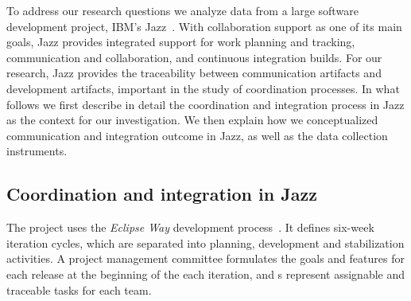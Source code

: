To address our research questions we analyze data from a large software
development project, IBM's Jazz~\cite{frost:ieeesoftware:2007}. With collaboration support
as one of its main goals, Jazz provides integrated support for work planning and
tracking, communication and collaboration, and continuous integration builds. For
our research, Jazz provides the traceability between communication artifacts and
development artifacts, important in the study of coordination processes. In what
follows we first describe in detail the coordination and integration process in
Jazz as the context for our investigation. We then explain how we conceptualized
communication and integration outcome in Jazz, as well as the data collection
instruments.


\subsection{Coordination and integration in Jazz}

The project uses the \emph{Eclipse Way} development process~\cite{frost:ieeesoftware:2007}.
It defines six-week iteration cycles, which are separated into planning,
development and stabilization activities. A project management committee
formulates the goals and features for each release at the beginning of the each
iteration, and s represent assignable and traceable tasks for each
team.

